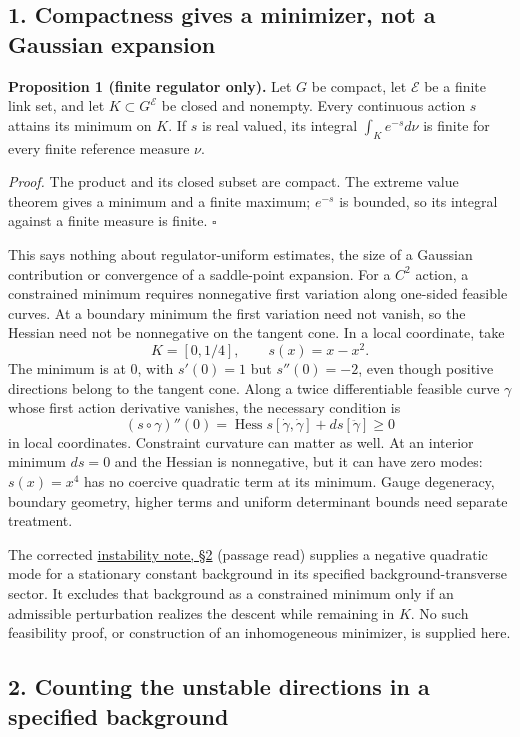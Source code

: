 \documentclass[11pt,a4paper]{article}
\begin{document}
\subsection{1. Compactness gives a minimizer, not a Gaussian
expansion}\label{compactness-gives-a-minimizer-not-a-gaussian-expansion}

\textbf{Proposition 1 (finite regulator only).} Let \(G\) be compact,
let \(\mathcal E\) be a finite link set, and let
\(K\subset G^{\mathcal E}\) be closed and nonempty. Every continuous
action \(s\) attains its minimum on \(K\). If \(s\) is real valued, its
integral \(\int_K e^{-s}d\nu\) is finite for every finite reference
measure \(\nu\).

\emph{Proof.} The product and its closed subset are compact. The extreme
value theorem gives a minimum and a finite maximum; \(e^{-s}\) is
bounded, so its integral against a finite measure is finite. \(\square\)

This says nothing about regulator-uniform estimates, the size of a
Gaussian contribution or convergence of a saddle-point expansion. For a
\(C^2\) action, a constrained minimum requires nonnegative first
variation along one-sided feasible curves. At a boundary minimum the
first variation need not vanish, so the Hessian need not be nonnegative
on the tangent cone. In a local coordinate, take
\[K=[0,1/4],\qquad s(x)=x-x^2.\] The minimum is at \(0\), with
\(s'(0)=1\) but \(s''(0)=-2\), even though positive directions belong to
the tangent cone. Along a twice differentiable feasible curve \(\gamma\)
whose first action derivative vanishes, the necessary condition is
\[(s\circ\gamma)''(0)
=\operatorname{Hess}s[\dot\gamma,\dot\gamma]
+ds[\ddot\gamma]\ge0\] in local coordinates. Constraint curvature can
matter as well. At an interior minimum \(ds=0\) and the Hessian is
nonnegative, but it can have zero modes: \(s(x)=x^4\) has no coercive
quadratic term at its minimum. Gauge degeneracy, boundary geometry,
higher terms and uniform determinant bounds need separate treatment.

The corrected \href{flow-instability-large-field.md}{instability note,
§2} (passage read) supplies a negative quadratic mode for a stationary
constant background in its specified background-transverse sector. It
excludes that background as a constrained minimum only if an admissible
perturbation realizes the descent while remaining in \(K\). No such
feasibility proof, or construction of an inhomogeneous minimizer, is
supplied here.

\subsection{2. Counting the unstable directions in a specified
background}\label{counting-the-unstable-directions-in-a-specified-background}
\end{document}
